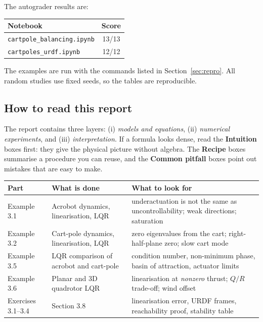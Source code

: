 \documentclass[11pt]{article}
\begin{document}
The autograder results are:
\begin{center}
\begin{tabular}{lc}
\toprule
Notebook & Score \\
\midrule
\texttt{cartpole\_balancing.ipynb} & 13/13 \\
\texttt{cartpoles\_urdf.ipynb} & 12/12 \\
\bottomrule
\end{tabular}
\end{center}

\noindent
The examples are run with the commands listed in
Section~\ref{sec:repro}.  All random studies use fixed seeds, so the tables
are reproducible.

\subsection*{How to read this report}

The report contains three layers: (i) \emph{models and equations},
(ii) \emph{numerical experiments}, and (iii) \emph{interpretation}.
If a formula looks dense, read the \textbf{Intuition} boxes first: they give
the physical picture without algebra.  The \textbf{Recipe} boxes summarise a
procedure you can reuse, and the \textbf{Common pitfall} boxes point out
mistakes that are easy to make.

\begin{center}
\small
\begin{tabular}{p{}p{}p{}}
\toprule
Part & What is done & What to look for \\
\midrule
Example 3.1 & Acrobot dynamics, linearisation, LQR & underactuation is not
the same as uncontrollability; weak directions; saturation \\
Example 3.2 & Cart-pole dynamics, linearisation, LQR & zero eigenvalues from
the cart; right-half-plane zero; slow cart mode \\
Example 3.5 & LQR comparison of acrobot and cart-pole & condition number,
non-minimum phase, basin of attraction, actuator limits \\
Example 3.6 & Planar and 3D quadrotor LQR & linearisation at \emph{nonzero}
thrust; $Q/R$ trade-off; wind offset \\
Exercises 3.1--3.4 & Section 3.8 & linearisation error, URDF frames,
reachability proof, stability table \\
\bottomrule
\end{tabular}
\end{center}
\end{document}
